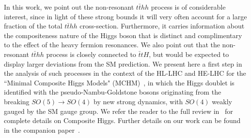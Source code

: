 
In this work, we point out the non-resonant ${t\bar t}hh$ process is of considerable interest, since in light of these strong bounds it will very often account for a large fraction of the total ${t\bar t}hh$ cross-section. Furthermore, it carries
information about the compositeness nature of the Higgs boson that is distinct and complimentary to the effect of the heavy fermion resonances. We also point out that the non-resonant
${t\bar t}hh$ process is closely connected to ${\bar t}tH$, but would be expected to display larger deviations from the
SM prediction.  We present here a first step in the analysis of such
processes in the context of the HL-LHC and HE-LHC for the ``Minimal Composite Higgs
Models" (MCHM)~\cite{Agashe:2004rs}, in which the Higgs doublet is identified with the pseudo-Nambu-Goldstone bosons originating from the breaking $SO(5) \to SO(4)$ by new strong dynamics, with $SO(4)$ weakly gauged by the SM gauge group. We refer the
reader to the full review in~\cite{Panico:2015jxa} for complete
details on Composite Higgs.  Further details on our work
 can be found in the companion paper~\cite{MCHMtthh}.



